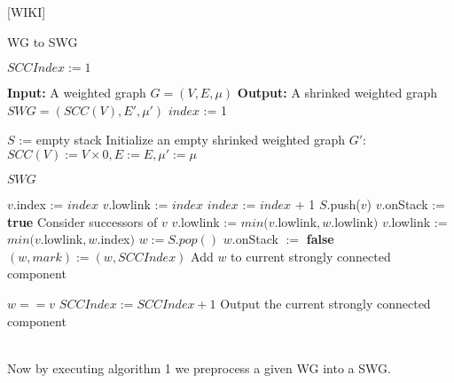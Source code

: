 \documentclass{article}
\begin{document}
[WIKI]
\begin{algorithm}
	\caption{WG to SWG}
	\begin{algorithmic}[1]
	\State $SCCIndex := 1$
		
		\State\textbf{Input:} A weighted graph $G = (V,E,\mu)$
		\State\textbf{Output:} A shrinked weighted graph $SWG = (SCC(V), E', \mu')$	
		\State 
		\State $index$ := 1
		
		\State $S$ := empty stack
		\State Initialize  an empty shrinked weighted graph $G'$: 
		\State $SCC(V) := V\times {0}, E:=E, \mu' := \mu$
			
		\State  
				\State {}
			\EndIf
		\EndFor
		\State\Return $SWG$
		\EndFunction
		
		\State
			\State $v.$index := $index$
			\State $v$.lowlink := $index$
			\State $index$ := $index$ + 1
			\State $S$.push($v$)
			\State $v$.onStack := \textbf{true}
			\State			
			\State \Comment Consider successors of $v$
					\State{}
					\State $v$.lowlink := $min(v$.lowlink$, w$.lowlink$ )$ 
					\State $v$.lowlink := $min(v$.lowlink$, w. $index$)$ 
				\EndIf
			\EndFor
			\State
				\Repeat
					\State $w := S.pop()$					
					\State $w$.onStack $:= $ \textbf{false}
					\State $(w, mark) := (w, SCCIndex)$
					\State \Comment Add $w$ to current strongly connected component 
				
				
				\Until
				$w == v$
				\State $SCCIndex := SCCIndex + 1$ 
				\State\Comment Output the current strongly connected component
			\EndIf
		\EndFunction
	\end{algorithmic}

\end{algorithm}
\\
 
Now by executing algorithm 1 we preprocess a given WG into a SWG.
\end{document}
